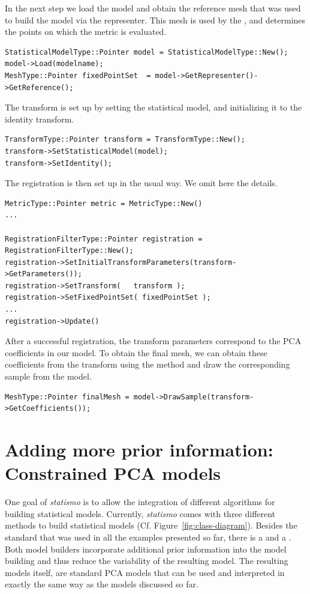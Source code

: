 \documentclass{InsightArticle}
\newcommand{\statismo}{\emph{statismo}\xspace}
\begin{document}
In the next step we load the model and obtain the reference mesh that was used to build the model via
the representer. This mesh is used by the , and determines the points on which the 
metric is evaluated. 
\begin{verbatim}
StatisticalModelType::Pointer model = StatisticalModelType::New();
model->Load(modelname);
MeshType::Pointer fixedPointSet  = model->GetRepresenter()->GetReference();
\end{verbatim}

The transform is set up by setting the statistical model, and initializing it to the identity transform. 
\begin{verbatim}
TransformType::Pointer transform = TransformType::New();
transform->SetStatisticalModel(model);
transform->SetIdentity();
\end{verbatim}

The registration is then set up in the usual way. We omit here the details.
\begin{verbatim}
MetricType::Pointer metric = MetricType::New()
...

RegistrationFilterType::Pointer registration = RegistrationFilterType::New();
registration->SetInitialTransformParameters(transform->GetParameters());
registration->SetTransform(   transform );
registration->SetFixedPointSet( fixedPointSet );
...
registration->Update()
\end{verbatim}

After a successful registration, the transform parameters correspond to the PCA coefficients in our model. 
To obtain the final mesh, we can obtain these coefficients from the transform using the method  
and draw the corresponding sample from the model. 
\begin{verbatim}
MeshType::Pointer finalMesh = model->DrawSample(transform->GetCoefficients());
\end{verbatim}


\section{Adding more prior information: Constrained PCA models }
One goal of \statismo is to allow the integration of  different algorithms for building statistical models.
Currently, \statismo comes with three different methods to build statistical models (Cf. Figure~\ref{fig:class-diagram}). Besides the standard  that was used in all the examples presented so far, there is a  \cite{TODO} and a  \cite{TODO}. Both model builders incorporate additional prior information into the model building and thus reduce the variability of the resulting model. The resulting models itself, are standard PCA models that can be used and interpreted in exactly the same way as the models discussed so far. 
\end{document}
